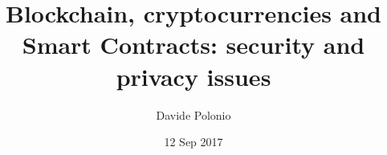 \documentclass{beamer}
\title{Blockchain, cryptocurrencies and Smart Contracts: security and privacy
issues}
\author{Davide Polonio}
\date{12 Sep 2017}
\institute{University of Padova}
\begin{document}
\graphicspath{{res/image/}}


\end{document}
